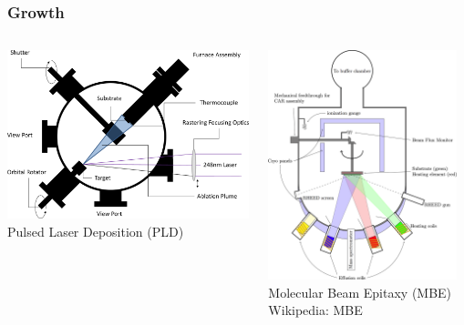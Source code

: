 \documentclass[]{beamer}%
\begin{document}
\begin{frame}
        \frametitle{Growth}
    \begin{columns}
        \begin{column}{0.54\textwidth}
            \centering
            \includegraphics[width=\textwidth]{graphics/exp_PLD_chamber} \\
            Pulsed Laser Deposition (PLD)
        \end{column}
        \begin{column}{0.46\textwidth}
            \centering
           \includegraphics[width=0.95\textwidth]{graphics/MBE} \\
           Molecular Beam Epitaxy (MBE) \\
           \TINY Wikipedia: MBE
        \end{column}
    \end{columns}
\end{frame}
\end{document}
